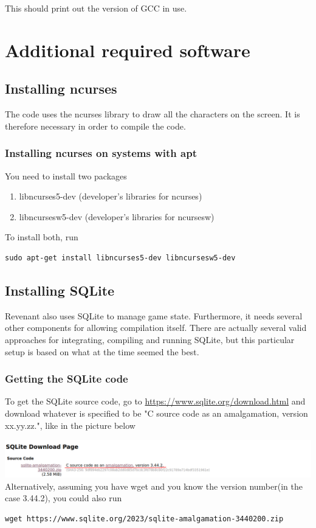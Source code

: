 \documentclass{report}
\begin{document}
This should print out the version of GCC in use.
\section*{Additional required software}
\subsection*{Installing ncurses}
The code uses the ncurses library to draw all the characters on the screen. It is therefore necessary in order to compile the code.
\subsubsection*{Installing ncurses on systems with apt}
You need to install two packages
\begin{enumerate}
\item  libncurses5-dev (developer’s libraries for ncurses)
\item  libncursesw5-dev (developer’s libraries for ncursesw)
\end{enumerate}
To install both, run
\begin{lstlisting}
sudo apt-get install libncurses5-dev libncursesw5-dev
\end{lstlisting}
\subsection*{Installing SQLite}
Revenant also uses SQLite to manage game state. Furthermore, it needs several other components for allowing compilation itself. There are actually several valid approaches for integrating, compiling and  running SQLite, but this particular setup is based on what at the time seemed the best.

\subsubsection*{Getting the SQLite code}
To get the SQLite source code, go to \url{https://www.sqlite.org/download.html} and download whatever is specified to be "C source code as an amalgamation, version xx.yy.zz.", like in the picture below

\includegraphics[width=\textwidth]{sqlite.png}
Alternatively, assuming you have wget and you know the version number(in the case 3.44.2), you could also run
\begin{lstlisting}
wget https://www.sqlite.org/2023/sqlite-amalgamation-3440200.zip
\end{lstlisting}
\end{document}
